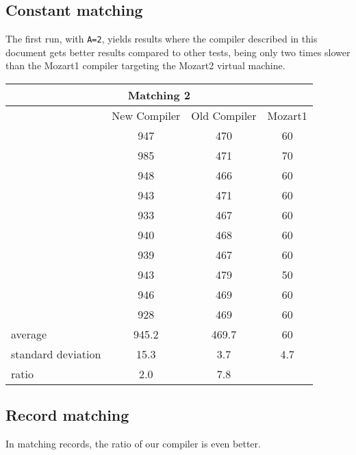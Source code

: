 \documentclass[a4paper]{memoir}
\begin{document}
\begin{appendices}
\subsection{Constant matching}
The first run, with \lstinline!A=2!, yields results where the compiler
described in this document gets better results compared to other tests, being
only two times slower than the Mozart1 compiler targeting the Mozart2 virtual
machine.
\begin{center}
\begin{tabular} {| l c c c|}
\hline
\multicolumn{4}{|c|}{\textbf{Matching 2}} \\ \hline
  & New Compiler& Old Compiler & Mozart1 \\
  &         947& 470& 60\\ 
  &         985& 471& 70\\
  &         948& 466& 60\\
  &         943& 471& 60\\
  &         933& 467& 60\\
  &         940& 468& 60\\
  &         939& 467& 60\\
  &         943& 479& 50\\
  &         946& 469& 60\\
  &         928& 469& 60\\ \hline
average& 945.2& 469.7 & 60\\
standard deviation&15.3&  3.7 & 4.7\\
ratio&  2.0& 7.8& \\
\hline
\end{tabular}
\end{center}


\subsection{Record matching}
In matching records, the ratio of our compiler is even better.


\end{appendices}
\end{document}
